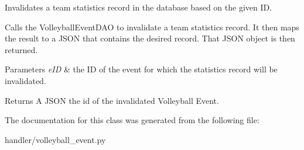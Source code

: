 Invalidates a team statistics record in the database based on the given ID. 

Calls the Volleyball\+Event\+D\+AO to invalidate a team statistics record. It then maps the result to a J\+S\+ON that contains the desired record. That J\+S\+ON object is then returned.


\begin{DoxyParams}{Parameters}
{\em e\+ID} & the ID of the event for which the statistics record will be invalidated.\\
\hline
\end{DoxyParams}
\begin{DoxyReturn}{Returns}
A J\+S\+ON the id of the invalidated Volleyball Event. 
\end{DoxyReturn}


The documentation for this class was generated from the following file\+:\begin{DoxyCompactItemize}
\item 
handler/volleyball\+\_\+event.\+py\end{DoxyCompactItemize}

